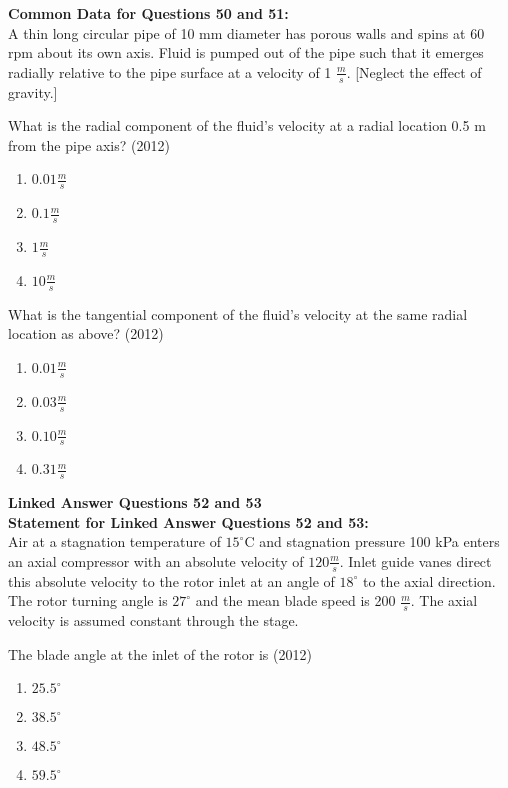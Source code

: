      \textbf{Common Data for Questions 50 and 51:}\\
     A thin long circular pipe of 10 mm diameter has porous walls and spins at 60 rpm about its own axis. Fluid
     is pumped out of the pipe such that it emerges radially relative to the pipe surface at a velocity of 1 $\frac{m}{s}$.
     [Neglect the effect of gravity.] 
    \item What is the radial component of the fluid's velocity at a radial location 0.5 m from the pipe axis? \hfill (2012)
    \begin{enumerate}[label=(\Alph*)]
        \item $0.01\frac{m}{s}$
        \item $0.1\frac{m}{s}$
        \item $1\frac{m}{s}$
        \item $10\frac{m}{s}$
    \end{enumerate}
    \item What is the tangential component of the fluid's velocity at the same radial location as above? \hfill (2012)
    \begin{enumerate}[label=(\Alph*)]
        \item $0.01\frac{m}{s}$
        \item $0.03\frac{m}{s}$
        \item $0.10\frac{m}{s}$
        \item $0.31\frac{m}{s}$
    \end{enumerate}
    \textbf{Linked Answer Questions 52 and 53}\\
    \textbf{Statement for Linked Answer Questions 52 and 53:}\\
    Air at a stagnation temperature of $15^{\circ}$C and stagnation pressure 100 kPa enters an axial compressor with an
absolute velocity of $120\frac{m}{s}$. Inlet guide vanes direct this absolute velocity to the rotor inlet at an angle of
$18^{\circ}$ to the axial direction. The rotor turning angle is $27^{\circ}$ and the mean blade speed is 200 $\frac{m}{s}$. The axial
velocity is assumed constant through the stage.
    \item The blade angle at the inlet of the rotor is \hfill (2012)
    \begin{enumerate}[label=(\Alph*)]
        \item $25.5^{\circ}$ 
        \item $38.5^{\circ}$ 
        \item $48.5^{\circ}$ 
        \item $59.5^{\circ}$ 
    \end{enumerate} 

